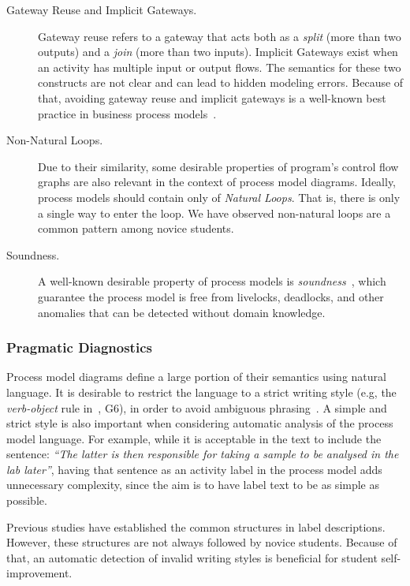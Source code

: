 \begin{description}
\item[Gateway Reuse and Implicit Gateways.]{Gateway reuse refers to a gateway
    that acts both as a \emph{split} (more than two outputs) and a \emph{join}
    (more than two inputs). Implicit Gateways exist when an activity has
    multiple input or output flows. The semantics for these two constructs are not
    clear and can lead to hidden modeling errors. Because of that, avoiding
    gateway reuse and implicit gateways is a well-known best practice in
    business process models~\cite{MendlingRA10}.}
\item[Non-Natural Loops.]{Due to their similarity, some desirable properties of
    program's control flow graphs are also relevant in the context of process
    model diagrams. Ideally, process models should contain only of \emph{Natural
      Loops}. That is, there is only a single way to enter the loop. 
      We have observed non-natural loops are a common pattern among novice
      students.}
\item[Soundness.]{A well-known desirable property of process models is {\em
      soundness}~\cite{AalstHHSVVW11}, which guarantee the process model is free
    from livelocks, deadlocks, and other anomalies that can be detected without
    domain knowledge.}
\end{description}

\subsubsection{Pragmatic Diagnostics}

Process model diagrams define a large portion of their semantics using natural
language. It is desirable to restrict the language to a strict writing style
(e.g, the {\em verb-object} rule in~\cite{MendlingRA10}, G6), in order to avoid
ambiguous phrasing~\cite{Leopold0M12}. A simple and strict style is also
important when considering automatic analysis of the process model language. For
example, while it is acceptable in the text to include the sentence: \emph{``The
  latter is then responsible for taking a sample to be analysed in the lab
  later''}, having that sentence as an activity label in the process model adds
unnecessary complexity, since the aim is to have label text to be as simple as
possible.

Previous studies \cite{mendling2010activity, Leopold0M12, leopold2013detection}
have established the common structures in label descriptions. However, these
structures are not always followed by novice students. Because of that, an
automatic detection of invalid writing styles is beneficial for student
self-improvement.

